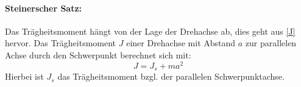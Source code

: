 \paragraph{Steinerscher Satz:}
Das Trägheitsmoment hängt von der Lage der Drehachse ab, dies geht aus \cref{J} hervor. Das Trägheitsmoment \(J\) einer Drehachse mit Abstand \(a\) zur parallelen Achse durch den Schwerpunkt berechnet sich mit:
\begin{equation}
    J=J_s+ma^2
    \label{Steiner}
\end{equation}
Hierbei ist \(J_s\) das Trägheitsmoment bzgl. der parallelen Schwerpunktachse.
